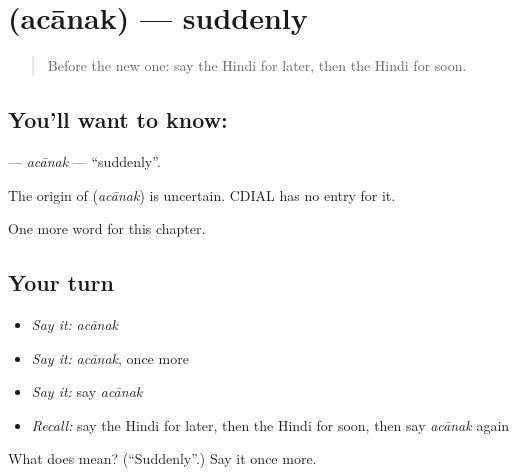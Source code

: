 \section[\texorpdfstring{\hi{अचानक} (acānak)}{अचानक (acānak)}]{ (acānak) — suddenly}

\label{lesson:HI-C248-acanak}



\begin{quote}
Before the new one: say the Hindi for later, then the Hindi for soon.
\end{quote}

\subsection*{You'll want to know: }
\textbf{} — \emph{acānak} — \textquotedblleft{}suddenly\textquotedblright{}.

\begin{cousinweb}
The origin of \textbf{} (\emph{acānak}) is uncertain. CDIAL has no entry for it.
\end{cousinweb}

\begin{grammarlens}[title={What you've built}]
One more word for this chapter.
\end{grammarlens}

\subsection*{Your turn}
\begin{itemize}
\raggedright
  \item \emph{Say it:} \emph{acānak}
  \item \emph{Say it:} \emph{acānak}, once more
  \item \emph{Say it:} say \emph{acānak}
  \item \emph{Recall:} say the Hindi for later, then the Hindi for soon, then say \emph{acānak} again
\end{itemize}

\begin{tcolorbox}[breakable,colback=teal!4,colframe=teal!35!black,title={Before you move on}]
What does  mean? (\textquotedblleft{}Suddenly\textquotedblright{}.) Say it once more.
\end{tcolorbox}
